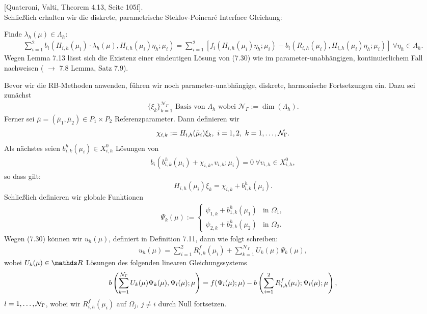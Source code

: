 
[Quateroni, Valti, Theorem 4.13, Seite 105f]. \\

Schließlich erhalten wir die diskrete, parametrische Steklov-Poincaré Interface Gleichung:

Finde $\lambda_h(\mu)\in \Lambda_h$:
\begin{align}
\sum_{i=1}^2 b_i(H_{i,h}(\mu_i)\cdot \lambda_h(\mu), H_{i,h}(\mu_i)\eta_h; \mu_i) = \sum_{i=1}^2 [ f_i(H_{i,h}(\mu_i)\eta_h; \mu_i) - b_i(R_{i,h}(\mu_i), H_{i,h}(\mu_i)\eta_h ;\mu_i) ] ~\forall\eta_h \in \Lambda_h.
\end{align}
Wegen Lemma 7.13 lässt sich die Existenz einer eindeutigen Lösung von (7.30) wie im parameter-unabhängigen, kontinuierlichem Fall nachweisen ( $\rightarrow$ 7.8 Lemma, Satz 7.9).

Bevor wir die RB-Methoden anwenden, führen wir noch parameter-unabhängige, diskrete, harmonische Fortsetzungen ein.
Dazu sei zunächst
\begin{align}
\{\xi_k\}_{k=1}^{\mathcal{N}_\Gamma} \text{ Basis von } \Lambda_h \text{ wobei } \mathcal{N}_\Gamma := \dim(\Lambda_h).
\end{align}
Ferner sei $\bar{\mu} = (\bar{\mu}_1,\bar{\mu}_2)\in P_1\times P_2$ Referenzparameter.
Dann definieren wir
\begin{align}
\chi_{i,k} := H_{i,h}(\bar{\mu}_i)\xi_k,~i=1,2,~ k=1, \dots ,\mathcal{N}_\Gamma.
\end{align}
Als nächstes seien $b_{i,k}^h(\mu_i)\in X_{i,h}^0$ Lösungen von
\begin{align}
b_i(b_{i,k}^h(\mu_i) + \chi_{i,k}, v_{i,h}; \mu_i) = 0 ~\forall v_{i,h}\in X_{i,h}^0,
\end{align}
so dass gilt: 
\[
H_{i,h}(\mu_i) \xi_k = \chi_{i,k} + b_{i,k}^h(\mu_i).
\]
Schließlich definieren wir globale Funktionen
\begin{align}
\Psi_k(\mu) := \left\{\begin{array}{lc} \psi_{1,k} + b_{1,k}^h(\mu_1) & \text{in } \Omega_1,\\ \psi_{2,k} + b_{2,k}^h(\mu_2) & \text{in } \Omega_2. \end{array}\right.
\end{align}
Wegen (7.30) können wir $u_h(\mu)$, definiert in Definition 7.11, dann wie folgt schreiben:
\begin{align}
u_h(\mu) = \sum_{i=1}^2 R_{i,h}^f(\mu_i) + \sum_{k=1}^{\mathcal{N}_\Gamma} U_k(\mu)\Psi_k(\mu),
\end{align}
wobei $U_k(\mu)\in \R$ Lösungen des folgenden linearen Gleichungssystems
\[
b\left(  \sum_{k=1}^{\mathcal{N}_\Gamma} U_k(\mu)\Psi_k(\mu) , \Psi_l(\mu); \mu\right) = f(\Psi_l(\mu); \mu) - b\left( \sum_{i=1}^2 R_{i,h}^f(\mu_i); \Psi_l(\mu); \mu\right),
\]
$l=1, \dots , \mathcal{N}_\Gamma$, wobei wir $R_{i,h}^f(\mu_i)$ auf $\Omega_j$, $j\neq i$ durch Null fortsetzen.

